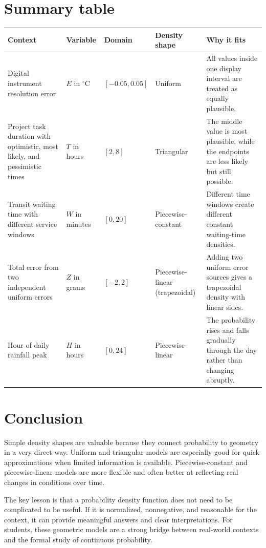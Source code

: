 \documentclass[11pt]{article}
\begin{document}
	\section{Summary table}
	
	\small
	\begin{tabularx}{\textwidth}{>{\raggedright\arraybackslash}p{2.7cm} >{\raggedright\arraybackslash}p{2.2cm} >{\raggedright\arraybackslash}p{2.2cm} >{\raggedright\arraybackslash}p{2.3cm} X}
		\toprule
		\textbf{Context} & \textbf{Variable} & \textbf{Domain} & \textbf{Density shape} & \textbf{Why it fits} \\
		\midrule
		Digital instrument resolution error & $E$ in $^\circ\text{C}$ & $[-0.05,0.05]$ & Uniform & All values inside one display interval are treated as equally plausible. \\
		\addlinespace
		Project task duration with optimistic, most likely, and pessimistic times & $T$ in hours & $[2,8]$ & Triangular & The middle value is most plausible, while the endpoints are less likely but still possible. \\
		\addlinespace
		Transit waiting time with different service windows & $W$ in minutes & $[0,20]$ & Piecewise-constant & Different time windows create different constant waiting-time densities. \\
		\addlinespace
		Total error from two independent uniform errors & $Z$ in grams & $[-2,2]$ & Piecewise-linear (trapezoidal) & Adding two uniform error sources gives a trapezoidal density with linear sides. \\
		\addlinespace
		Hour of daily rainfall peak & $H$ in hours & $[0,24]$ & Piecewise-linear & The probability rises and falls gradually through the day rather than changing abruptly. \\
		\bottomrule
	\end{tabularx}
	\normalsize
	
	\section{Conclusion}
	
	Simple density shapes are valuable because they connect probability to geometry in a very direct way. Uniform and triangular models are especially good for quick approximations when limited information is available. Piecewise-constant and piecewise-linear models are more flexible and often better at reflecting real changes in conditions over time.
	
	The key lesson is that a probability density function does not need to be complicated to be useful. If it is normalized, nonnegative, and reasonable for the context, it can provide meaningful answers and clear interpretations. For students, these geometric models are a strong bridge between real-world contexts and the formal study of continuous probability.
	
\end{document}
